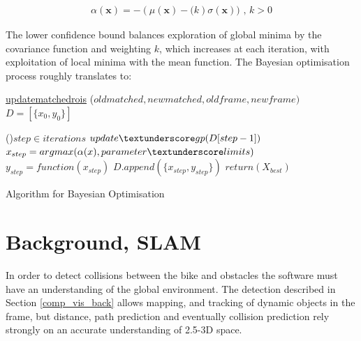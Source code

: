 \documentclass[11pt,twoside]{report}
\begin{document}
\begin{equation}
\begin{aligned}
\alpha(\mathbf{x}) = -(\mu(\mathbf{x}) - \mathit(k) \sigma (\mathbf{x})) \text{ , } k>0
\end{aligned}
\label{gp_lower_confidence}
\end{equation}


The lower confidence bound balances exploration of global minima by the covariance function and weighting $k$, which increases at each iteration, with exploitation of local minima with the mean function. The Bayesian optimisation process roughly translates to:\newline\newline
\begin{algorithm}[H]
	\DontPrintSemicolon
	\SetAlgoLined
	\underline{update\textunderscore matched\textunderscore rois} ($old$\textunderscore$matched,new$\textunderscore$matched,old$\textunderscore$frame,new$\textunderscore$frame)$\;
	\texttt{\\}
	$D = [\{ x_{0},y_{0} \}]$ 
	
	\ForEach(){$step \in iterations$}{
		$update \textunderscore gp(D[step-1])$ 
		$x_{step} = argmax(\alpha(x),parameter \textunderscore limits)$ 
		$y_{step} = function(x_{step})$ 
		$D.append( \{ x_{step},y_{step} \} )$ 
	}
	$return (X_{best})$ 
	\texttt{\\}
	\caption{Algorithm for Bayesian Optimisation}
	\label{alg:weights}
\end{algorithm}

\newpage

\section{Background, SLAM} \label{back_slam}
In order to detect collisions between the bike and obstacles the software must have an understanding of the global environment. The detection described in Section \ref{comp_vis_back} allows mapping, and tracking of dynamic objects in the frame, but distance, path prediction and eventually collision prediction rely strongly on an accurate understanding of 2.5-3D space.
\end{document}
